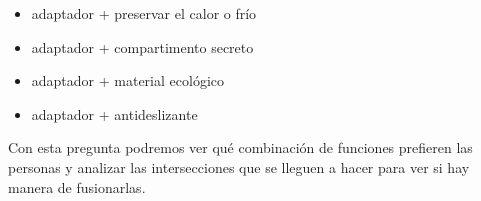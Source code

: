 
\begin{itemize}
    \item adaptador + preservar el calor o frío
    \item adaptador + compartimento secreto
    \item adaptador + material ecológico
    \item adaptador + antideslizante
\end{itemize}

Con esta pregunta podremos ver qué combinación de funciones prefieren las personas y analizar las intersecciones que se lleguen a hacer para ver si hay manera de fusionarlas.

